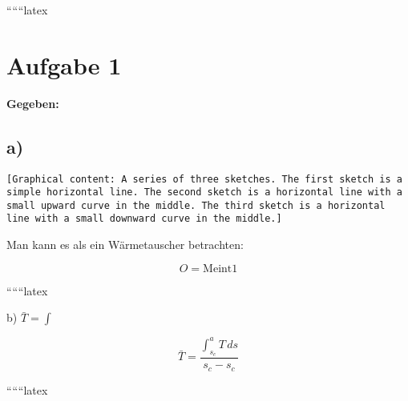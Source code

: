 
``````latex


\section*{Aufgabe 1}

\textbf{Gegeben:}

\subsection*{a)}

\begin{verbatim}
[Graphical content: A series of three sketches. The first sketch is a simple horizontal line. The second sketch is a horizontal line with a small upward curve in the middle. The third sketch is a horizontal line with a small downward curve in the middle.]
\end{verbatim}

Man kann es als ein Wärmetauscher betrachten:

\[ O = \text{Meint1} \]

``````latex


b) $\bar{T} = \int$

\[
\bar{T} = \frac{\int_{s_c}^{a} T \, ds}{s_c - s_c}
\]

``````latex


